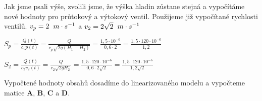 \documentclass{article}
\begin{document}
			Jak jsme psali výše, zvolili jsme, že výška hladin zůstane stejná a vypočítáme nové hodnoty pro průtokový a výtokový ventil. Použijeme již vypočítané rychlosti ventilů. $v_p=2 \hspace{2mm} m \cdot s^{-1}$ a $v_2=2\sqrt{2} \hspace{2mm} m \cdot s^{-1}$
			
			\begin{center} 
			
			$S_p=\frac{Q(t)}{c_v p(t)}=\frac{Q}{c_p\sqrt{2g(H_1-H_2)}}=\frac{1,5\cdot 10^{-6}}{0,6 \cdot 2}=\frac{1,5 \cdot 120 \cdot 10^{-6}}{1,2}$
			
			\bigskip

			$S_2=\frac{Q(t)}{c_2v_2(t)}=\frac{Q}{c_2\sqrt{2gH_2}}=\frac{1,5 \cdot 120 \cdot 10^{-6}}{0,6 \cdot 2\sqrt{2}}=\frac{1,5 \cdot 120 \cdot 10^{-6}}{1,2\sqrt{2}}$
			\end{center}
			
			Vypočtené hodnoty obsahů dosadíme do linearizovaného modelu a vypočteme matice \textbf{A}, \textbf{B}, \textbf{C} a \textbf{D}. 
			
\end{document}
